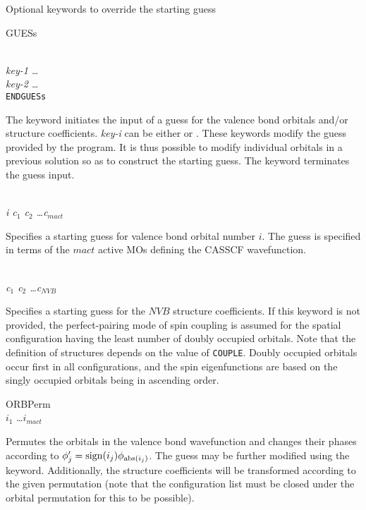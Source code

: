 Optional keywords to override the starting guess
\begin{keywordlist}
\item[GUESs]

\\
{\em key-1 \ldots}\\
{\em key-2 \ldots}\\
{\tt ENDGUESs}\\

The  keyword initiates the input of a guess for the valence bond orbitals and/or
structure coefficients. {\em key-i\/} can be either  or .
These keywords
modify the guess provided by the program. It is
thus possible to modify individual orbitals in a previous solution
so as to construct the starting
guess. The  keyword terminates the guess input.

\\
{\em i  c$_1$ c$_2$ \ldots c$_{mact}$}

Specifies a starting guess for valence bond orbital number $i$. The guess is specified
in terms of the $mact$ active MOs defining the CASSCF wavefunction.

\\
{\em c$_1$ c$_2$ \ldots c$_{NVB}$}

Specifies a starting guess for the $NVB$ structure coefficients. If this keyword
is not provided, the perfect-pairing mode of
spin coupling is assumed for the spatial configuration having the least
number of doubly occupied orbitals.
Note that the definition of structures depends on the value of {\tt COUPLE}. Doubly occupied
orbitals occur first in all configurations, and the spin eigenfunctions are based on the singly
occupied orbitals being in ascending order.
\item[ORBPerm]
\\
$i_1$ \ldots $i_{mact}$

Permutes the orbitals in the valence bond wavefunction and changes their phases according to
$\phi_j'={\rm sign}(i_j)\phi_{{\rm abs}(i_j)}$. The guess may be further modified using the
 keyword. Additionally, the structure coefficients will be transformed
according to the given permutation (note that the configuration list must be closed under
the orbital permutation for this to be possible).
\end{keywordlist}


